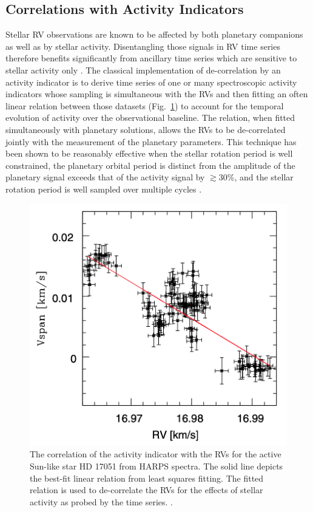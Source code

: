 \subsection{Correlations with Activity Indicators} \label{sect:indicators}
Stellar RV observations are known to be affected by both planetary companions as
well as by stellar activity. Disentangling those signals in RV time series
therefore benefits significantly from ancillary time series which are sensitive
to stellar activity only \citep{boisse09}.
The classical implementation of de-correlation by
an activity indicator is to derive time series of one or many spectroscopic
activity indicators whose sampling is simultaneous with the RVs and then
fitting an often linear relation between those datasets (Fig.~\ref{fig:corr}) to
account for the temporal evolution of activity over the observational baseline.
The relation, when fitted simultaneously with planetary solutions, allows the RVs
to be de-correlated jointly with the measurement of the planetary parameters.
This technique has been shown to be reasonably effective when the stellar rotation period
\prot{} is well constrained, the planetary orbital period is distinct from
\prot{,} the amplitude of the planetary signal exceeds that of the activity signal
by $\gtrsim 30$\%, and the stellar rotation period is well sampled over multiple
cycles \citep{boisse11}. \\

\begin{figure}
  \centering
  \includegraphics[width=.6\textwidth]{figures/vspan_rv.png}
  \caption[Correlation between stellar RVs and the \vspan{} activity indicator.]
      {The correlation of the \vspan{} activity indicator with the RVs for the
    active Sun-like star HD 17051 from HARPS spectra. The solid line depicts the
    best-fit linear relation from least squares fitting. The fitted relation is
    used to de-correlate the RVs for the effects of stellar activity as probed by
    the \vspan{} time series. \citep[Image credit:][]{boisse11}.}
  \label{fig:corr}
\end{figure}

